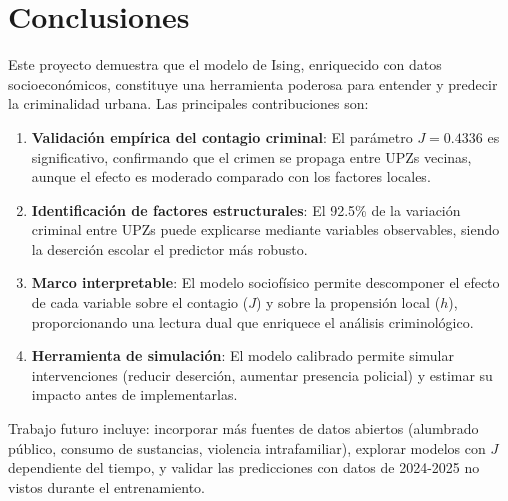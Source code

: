 \documentclass[12pt,a4paper]{article}
\begin{document}
\section{Conclusiones}

Este proyecto demuestra que el modelo de Ising, enriquecido con datos socioeconómicos, constituye una herramienta poderosa para entender y predecir la criminalidad urbana. Las principales contribuciones son:

\begin{enumerate}[label=\alph*)]
    \item \textbf{Validación empírica del contagio criminal}: El parámetro $J = 0.4336$ es significativo, confirmando que el crimen se propaga entre UPZs vecinas, aunque el efecto es moderado comparado con los factores locales.
    
    \item \textbf{Identificación de factores estructurales}: El 92.5\% de la variación criminal entre UPZs puede explicarse mediante variables observables, siendo la deserción escolar el predictor más robusto.
    
    \item \textbf{Marco interpretable}: El modelo sociofísico permite descomponer el efecto de cada variable sobre el contagio ($J$) y sobre la propensión local ($h$), proporcionando una lectura dual que enriquece el análisis criminológico.
    
    \item \textbf{Herramienta de simulación}: El modelo calibrado permite simular intervenciones (reducir deserción, aumentar presencia policial) y estimar su impacto antes de implementarlas.
\end{enumerate}

Trabajo futuro incluye: incorporar más fuentes de datos abiertos (alumbrado público, consumo de sustancias, violencia intrafamiliar), explorar modelos con $J$ dependiente del tiempo, y validar las predicciones con datos de 2024-2025 no vistos durante el entrenamiento.
\end{document}
